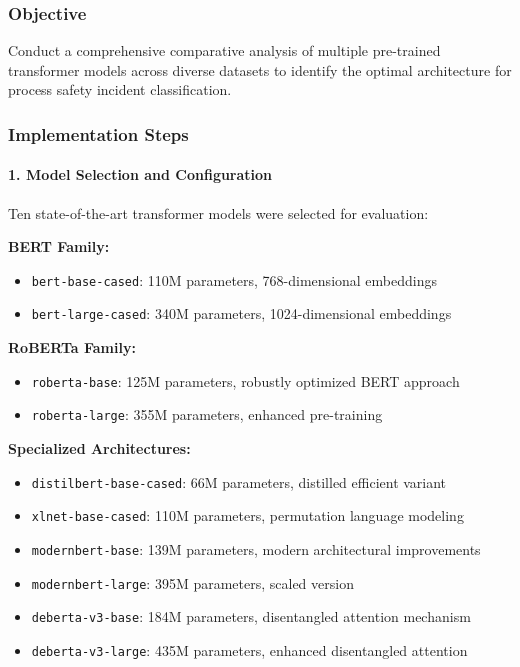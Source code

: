 \documentclass[11pt, titlepage, bibliography=totoc]{scrreprt}
\begin{document}
\subsubsection{Objective}
Conduct a comprehensive comparative analysis of multiple pre-trained transformer models across diverse datasets to identify the optimal architecture for process safety incident classification.

\subsubsection{Implementation Steps}

\paragraph{1. Model Selection and Configuration}
Ten state-of-the-art transformer models were selected for evaluation:

\textbf{BERT Family:}
\begin{itemize}
    \item \texttt{bert-base-cased}: 110M parameters, 768-dimensional embeddings
    \item \texttt{bert-large-cased}: 340M parameters, 1024-dimensional embeddings
\end{itemize}

\textbf{RoBERTa Family:}
\begin{itemize}
    \item \texttt{roberta-base}: 125M parameters, robustly optimized BERT approach
    \item \texttt{roberta-large}: 355M parameters, enhanced pre-training
\end{itemize}

\textbf{Specialized Architectures:}
\begin{itemize}
    \item \texttt{distilbert-base-cased}: 66M parameters, distilled efficient variant
    \item \texttt{xlnet-base-cased}: 110M parameters, permutation language modeling
    \item \texttt{modernbert-base}: 139M parameters, modern architectural improvements
    \item \texttt{modernbert-large}: 395M parameters, scaled version
    \item \texttt{deberta-v3-base}: 184M parameters, disentangled attention mechanism
    \item \texttt{deberta-v3-large}: 435M parameters, enhanced disentangled attention
\end{itemize}
\end{document}
